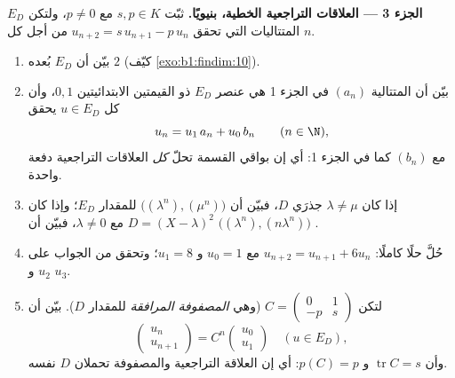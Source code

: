 \begin{problem}
\medskip
\noindent\textbf{الجزء 3 --- العلاقات التراجعية الخطية، بنيويًا.}
ثبّت $s, p \in K$ مع $p \neq 0$، ولتكن $E_D$ 
المتتاليات التي تحقق $u_{n+2} = s\,u_{n+1} - p\,u_n$ من أجل كل $n$.
\begin{enumerate}[resume]
  \item بيّن أن $E_D$  بُعده $2$
        (كيّف \cref{exo:b1:findim:10}).
  \item بيّن أن المتتالية $(a_n)$ في الجزء 1 هي عنصر
        $E_D$ ذو القيمتين الابتدائيتين $0, 1$، وأن كل $u
        \in E_D$ يحقق
        \[
        u_n = u_1\,a_n + u_0\,b_n \qquad (n \in \N),
        \]
        مع $(b_n)$ كما في الجزء 1: أي إن بواقي القسمة تحلّ
        \emph{كل} العلاقات التراجعية دفعة واحدة.
  \item إذا كان $\lambda \neq \mu$ جذرَي $D$، فبيّن أن
        $\bigl((\lambda^n), (\mu^n)\bigr)$  للمقدار $E_D$؛
        وإذا كان $D = (X-\lambda)^2$ مع $\lambda \neq 0$، فبيّن أن
        $\bigl((\lambda^n), (n\lambda^n)\bigr)$ .
  \item حُلَّ حلًا كاملًا: $u_{n+2} = u_{n+1} + 6u_n$ مع $u_0 = 1$ و
        $u_1 = 8$؛ وتحقق من الجواب على $u_2$ و $u_3$.
  \item لتكن $C = \begin{pmatrix} 0 & 1\\ -p & s\end{pmatrix}$
        (وهي \emph{المصفوفة المرافقة} للمقدار $D$). بيّن أن
        \[
        \begin{pmatrix} u_{n}\\ u_{n+1}\end{pmatrix}
        = C^n \begin{pmatrix} u_0\\ u_1\end{pmatrix}
        \quad (u \in E_D),
        \]
        وأن $\operatorname{tr} C = s$ و $p(C) = p$: أي إن
        العلاقة التراجعية والمصفوفة تحملان  $D$ نفسه.
\end{enumerate}


\end{problem}
